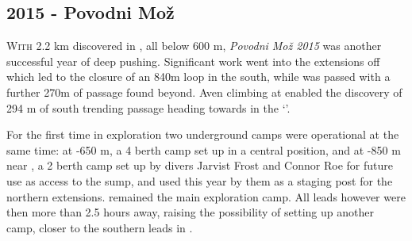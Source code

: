 \newpage
\begin{tcolorbox}
\chapter{2015 - Povodni Mo\v{z}}
		\lettrine{W}{ith} 2.2 km discovered in , all below 600 m, \emph{Povodni Mo\v{z} 2015} was another successful year of deep pushing. Significant work went into the extensions off  which led to the closure of an 840m loop in the south, while  was passed with a further 270m of passage found beyond. Aven climbing at  enabled the discovery of 294 m of south trending passage heading towards  in the `'. 

		For the first time in  exploration two underground camps were operational at the same time: at -650 m, a 4 berth camp set up in a central position, and  at -850 m near , a 2 berth camp set up by divers Jarvist Frost and Connor Roe for future use as access to the  sump, and used this year by them as a staging post for the northern extensions.  remained the main exploration camp. All leads however were then more than 2.5 hours away, raising the possibility of setting up another camp, closer to the southern leads in .
	

\end{tcolorbox}
\BgThispage



